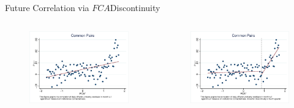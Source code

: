 \documentclass{beamer}
\begin{document}
	\begin{frame}{ Future Correlation via $ FCA $}{Discontinuity}\label{Monthly5}
		
		
		
		
		
		\begin{columns}
			\begin{figure}   
				\centering
				\includegraphics[width=\linewidth]{"mcorr5l.eps"}     \end{figure}            
			\begin{figure}
				\centering  
				\includegraphics[width=\linewidth]{"Qmcorr5lrd.eps"}
			\end{figure}
		\end{columns}
		\centering
		
		
	\end{frame}
	
\end{document}
